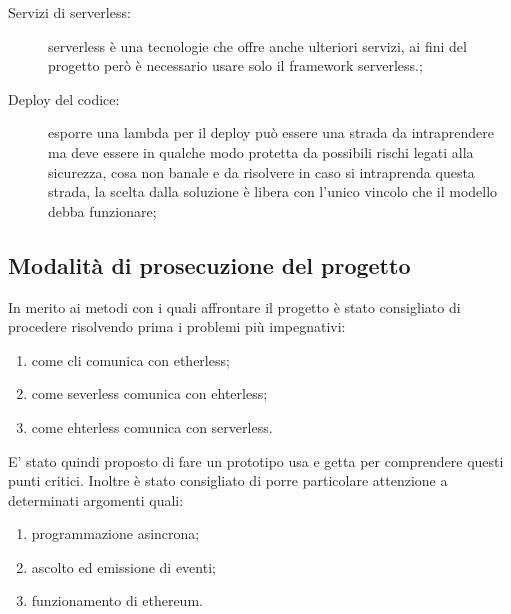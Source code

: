 \begin{description}
	\item[Servizi di serverless:] serverless è una tecnologie che offre anche ulteriori servizi, ai fini del progetto però è necessario usare solo il framework serverless.;
	\item[Deploy del codice:] esporre una lambda per il deploy può essere una strada da intraprendere ma deve essere in qualche modo protetta da possibili rischi legati alla sicurezza, cosa non banale e da risolvere in caso si intraprenda questa strada, la scelta dalla soluzione è libera con l'unico vincolo che il modello debba funzionare;
\end{description}

\subsection{Modalità di prosecuzione del progetto}
In merito ai metodi con i quali affrontare il progetto è stato consigliato di procedere risolvendo prima i problemi più impegnativi:
	\begin{enumerate}
		\item come cli comunica con etherless;
		\item come severless comunica con ehterless; 
		\item come ehterless comunica con serverless. 
	\end{enumerate}	
	E' stato quindi proposto di fare un prototipo usa e getta per comprendere questi punti critici.
	Inoltre è stato consigliato di porre particolare attenzione a determinati argomenti quali:
	\begin{enumerate}
		\item programmazione asincrona;
		\item ascolto ed emissione di eventi;
		\item funzionamento di ethereum.
	\end{enumerate}
